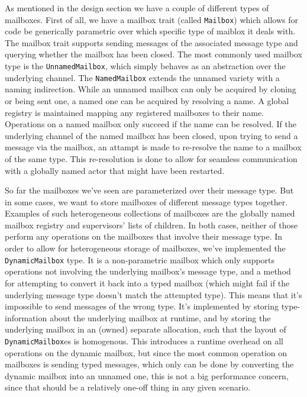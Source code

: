 \documentclass[a4paper]{article}
\begin{document}
\begin{itemize}
As mentioned in the design section we have a couple of different types of
mailboxes. First of all, we have a mailbox trait (called \texttt{Mailbox}) which
allows for code be generically parametric over which specific type of maiblox it
deals with. The mailbox trait supports sending messages of the associated
message type and querying whether the mailbox has been closed. The most commonly
used mailbox type is the \texttt{UnnamedMailbox}, which simply behaves as an
abstraction over the underlying channel. The \texttt{NamedMailbox} extends the
unnamed variety with a naming indirection. While an unnamed mailbox can only be
acquired by cloning or being sent one, a named one can be acquired by resolving
a name. A global registry is maintained mapping any registered mailboxes to
their name. Operations on a named mailbox only succeed if the name can be
resolved. If the underlying channel of the named mailbox has been closed, upon
trying to send a message via the mailbox, an attampt is made to re-resolve the name to a
mailbox of the same type. This re-resolution is done to allow for seamless
communication with a globally named actor that might have been restarted.

So far the mailboxes we've seen are parameterized over their message type. But in
some cases, we want to store mailboxes of different message types together.
Examples of such heterogeneous collections of mailboxes are the globally named
mailbox registry and supervisors' lists of children. In both cases, neither of
those perform any operations on the mailboxes that involve their message type.
In order to allow for heterogeneous storage of mailboxes, we've implemented the
\texttt{DynamicMailbox} type. It is a non-parametric mailbox which only supports
operations not involving the underlying mailbox's message type, and a method for
attempting to convert it back into a typed mailbox (which might fail if the
underlying message type doesn't match the attempted type). This means that it's
impossible to send messages of the wrong type. It's implemented by
storing type-information about the underlying mailbox at runtime, and by storing
the underlying mailbox in an (owned) separate allocation, such that the layout of
\texttt{DynamicMailbox}es is homogenous. This introduces a runtime overhead on
all operations on the dynamic mailbox, but since the most common operation on
mailboxes is sending typed messages, which only can be done by converting the
dynamic mailbox into an unnamed one, this is not a big performance concern,
since that should be a relatively one-off thing in any given scenario.


\end{itemize}
\end{document}
